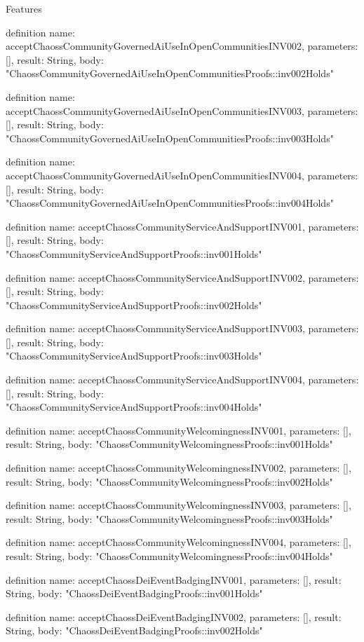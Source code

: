 \begin{lexlean}{Features}
\begin{semanticmodule}
definition{
  name: acceptChaossCommunityGovernedAiUseInOpenCommunitiesINV002,
  parameters: [],
  result: String,
  body: "ChaossCommunityGovernedAiUseInOpenCommunitiesProofs::inv002Holds"
}

definition{
  name: acceptChaossCommunityGovernedAiUseInOpenCommunitiesINV003,
  parameters: [],
  result: String,
  body: "ChaossCommunityGovernedAiUseInOpenCommunitiesProofs::inv003Holds"
}

definition{
  name: acceptChaossCommunityGovernedAiUseInOpenCommunitiesINV004,
  parameters: [],
  result: String,
  body: "ChaossCommunityGovernedAiUseInOpenCommunitiesProofs::inv004Holds"
}

definition{
  name: acceptChaossCommunityServiceAndSupportINV001,
  parameters: [],
  result: String,
  body: "ChaossCommunityServiceAndSupportProofs::inv001Holds"
}

definition{
  name: acceptChaossCommunityServiceAndSupportINV002,
  parameters: [],
  result: String,
  body: "ChaossCommunityServiceAndSupportProofs::inv002Holds"
}

definition{
  name: acceptChaossCommunityServiceAndSupportINV003,
  parameters: [],
  result: String,
  body: "ChaossCommunityServiceAndSupportProofs::inv003Holds"
}

definition{
  name: acceptChaossCommunityServiceAndSupportINV004,
  parameters: [],
  result: String,
  body: "ChaossCommunityServiceAndSupportProofs::inv004Holds"
}

definition{
  name: acceptChaossCommunityWelcomingnessINV001,
  parameters: [],
  result: String,
  body: "ChaossCommunityWelcomingnessProofs::inv001Holds"
}

definition{
  name: acceptChaossCommunityWelcomingnessINV002,
  parameters: [],
  result: String,
  body: "ChaossCommunityWelcomingnessProofs::inv002Holds"
}

definition{
  name: acceptChaossCommunityWelcomingnessINV003,
  parameters: [],
  result: String,
  body: "ChaossCommunityWelcomingnessProofs::inv003Holds"
}

definition{
  name: acceptChaossCommunityWelcomingnessINV004,
  parameters: [],
  result: String,
  body: "ChaossCommunityWelcomingnessProofs::inv004Holds"
}

definition{
  name: acceptChaossDeiEventBadgingINV001,
  parameters: [],
  result: String,
  body: "ChaossDeiEventBadgingProofs::inv001Holds"
}

definition{
  name: acceptChaossDeiEventBadgingINV002,
  parameters: [],
  result: String,
  body: "ChaossDeiEventBadgingProofs::inv002Holds"
}


\end{semanticmodule}
\end{lexlean}
